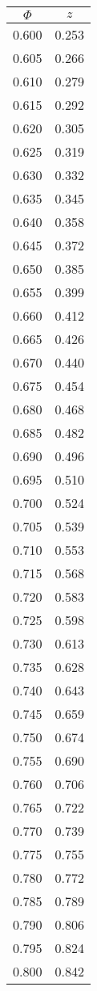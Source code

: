 \begin{tabular}{|c|c|}\hline
$\Phi$ & $z$ \\ \hline
0.600 & 0.253\\
0.605 & 0.266\\
0.610 & 0.279\\
0.615 & 0.292\\
0.620 & 0.305\\
0.625 & 0.319\\
0.630 & 0.332\\
0.635 & 0.345\\
0.640 & 0.358\\
0.645 & 0.372\\
0.650 & 0.385\\
0.655 & 0.399\\
0.660 & 0.412\\
0.665 & 0.426\\
0.670 & 0.440\\
0.675 & 0.454\\
0.680 & 0.468\\
0.685 & 0.482\\
0.690 & 0.496\\
0.695 & 0.510\\
0.700 & 0.524\\
0.705 & 0.539\\
0.710 & 0.553\\
0.715 & 0.568\\
0.720 & 0.583\\
0.725 & 0.598\\
0.730 & 0.613\\
0.735 & 0.628\\
0.740 & 0.643\\
0.745 & 0.659\\
0.750 & 0.674\\
0.755 & 0.690\\
0.760 & 0.706\\
0.765 & 0.722\\
0.770 & 0.739\\
0.775 & 0.755\\
0.780 & 0.772\\
0.785 & 0.789\\
0.790 & 0.806\\
0.795 & 0.824\\
0.800 & 0.842\\
\hline \end{tabular}

\columnbreak

